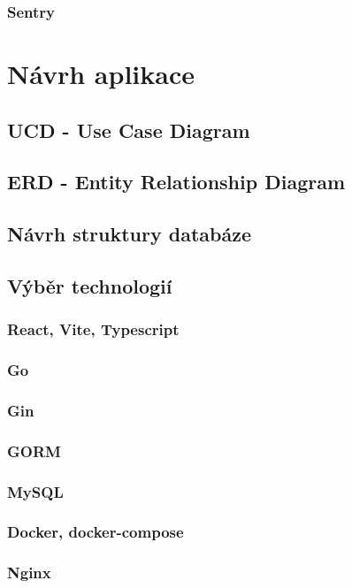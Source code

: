 \documentclass[14pt,a4paper]{article}
\begin{document}
            \subsubsection{Sentry}
	
	\section{Návrh aplikace}
        \subsection{UCD - Use Case Diagram}
        \subsection{ERD - Entity Relationship Diagram}
        \subsection{Návrh struktury databáze}
        \subsection{Výběr technologií}
            \subsubsection{React, Vite, Typescript}
            \subsubsection{Go}
            \subsubsection{Gin}
            \subsubsection{GORM}
            \subsubsection{MySQL}
            \subsubsection{Docker, docker-compose}
            \subsubsection{Nginx}
	
\end{document}
